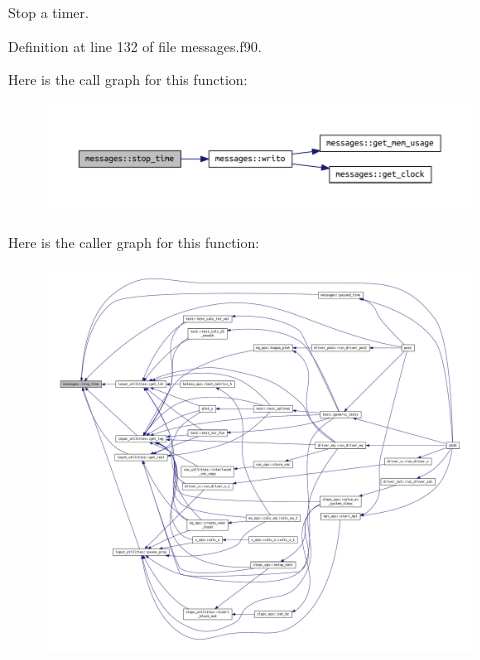 Stop a timer. 



Definition at line 132 of file messages.\+f90.

Here is the call graph for this function\+:\nopagebreak
\begin{figure}[H]
\begin{center}
\leavevmode
\includegraphics[width=350pt]{namespacemessages_aed343894ae4a28ad6dfbd1d39aac64ff_cgraph}
\end{center}
\end{figure}
Here is the caller graph for this function\+:\nopagebreak
\begin{figure}[H]
\begin{center}
\leavevmode
\includegraphics[width=350pt]{namespacemessages_aed343894ae4a28ad6dfbd1d39aac64ff_icgraph}
\end{center}
\end{figure}
\mbox{\label{namespacemessages_aa4a8d01563e92558e8a0875b075ec54c}} 
